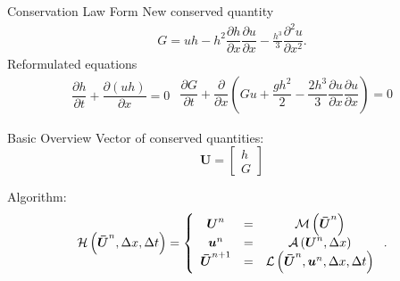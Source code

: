 \documentclass[pdf]{beamer}
\begin{document}
\begin{frame}{Conservation Law Form}
	New conserved quantity
	\begin{gather}\label{eq:Gdefinition}
	G = uh - h^2 \dfrac{\partial h}{\partial x} \dfrac{\partial u}{\partial x} - \frac{h^3}{3} \dfrac{\partial^2 u}{\partial x^2}.
	\end{gather}
	Reformulated equations
	\begin{subequations}
		\begin{gather}
		\dfrac{\partial h}{\partial t} + \dfrac{\partial (uh)}{\partial x} = 0
		\label{eq:Serrecon_continuity}
		\end{gather}
		\begin{gather}
		\dfrac{\partial G}{\partial t} + \dfrac{\partial}{\partial x}\left(Gu + \dfrac{gh^2}{2} - \dfrac{2h^3}{3}\dfrac{\partial u}{\partial x}\dfrac{\partial u}{\partial x}\right) = 0
		\label{eq:Serrecon_momentum}
		\end{gather}
		\label{eq:Serrecon}
	\end{subequations}
\end{frame}

\begin{frame}{Basic Overview}
	Vector of conserved quantities:
	\[\boldsymbol{U} = 
	\left[
	\begin{array}{c}
	h \\
	G							
	\end{array} \right] \]
	
	Algorithm:
	\[\mathcal{H}\left(\boldsymbol{\bar{U}}^n,\Delta x ,\Delta t \right) = \left\lbrace 
	\begin{array}{c c c} 
	\boldsymbol{U}^n &=& \mathcal{M}\left(\boldsymbol{\bar{U}}^n\right) \\
	\boldsymbol{u}^n &=& \mathcal{A}\left(\boldsymbol{U}^n, \Delta x\right) \\
	\boldsymbol{\bar{U}}^{n+1} &=& \mathcal{L}\left(\boldsymbol{\bar{U}}^{n},\boldsymbol{u}^n, \Delta x ,\Delta t\right)							
	\end{array} \right. .\]
\end{frame}
\end{document}
